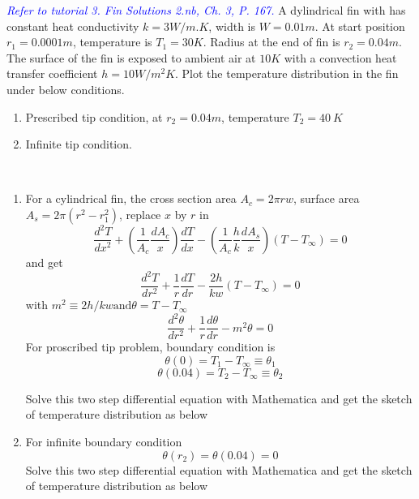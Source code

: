 \begin{example}
\textcolor{blue} {\emph{Refer to tutorial 3.  Fin Solutions 2.nb, Ch. 3, P. 167.}}
A dylindrical fin with has constant heat conductivity  $k=3W/m.K$, width is
$W=0.01m$. At start position $r_1=0.0001m$, temperature is $T_1=30K$. Radius at
the end of fin is $r_2=0.04m$. The surface of the fin is exposed to ambient air at
$10K$ with a convection heat transfer coefficient $h=10W/m^2K$. Plot the temperature distribution in the fin under below conditions.
\begin{enumerate}
\item Prescribed tip condition, at $r_2=0.04m$, temperature $T_2=40~K$
\item Infinite tip condition.
\end{enumerate}
\end{example}

\begin{solution}
~\\
\begin{enumerate}
\item For a cylindrical fin, the cross section area $A_c=2\pi rw$,
surface area $A_s=2\pi(r^2-r_1^2)$, replace $x$ by $r$ in
$$
\frac{d^2 T}{dx^2} + 
\left(\frac{1}{A_c}\frac{dA_c}{x}\right)\frac{dT}{dx}-
\left(\frac{1}{A_c}\frac{h}{k}\frac{dA_s}{x}\right)(T-T_\infty)=0
$$
and get
$$
\frac{d^2 T}{dr^2}+
\frac{1}{r}\frac{dT}{dr}-
\frac{2h}{kw}(T-T_\infty)=0
$$
with $m^2 \equiv 2h/kw \text{and} \theta=T-T_\infty$
$$
\frac{d^2 \theta}{dr^2}+
\frac{1}{r}\frac{d\theta}{dr}-
m^2\theta=0
$$
For proscribed tip problem, boundary condition is 
$$\theta(0)=T_1-T_\infty \equiv \theta_1$$
$$\theta(0.04)=T_2-T_\infty \equiv \theta_2$$

Solve this two step differential equation with Mathematica and get the sketch of temperature distribution as below
\item For infinite boundary condition
$$\theta(r_2)=\theta(0.04)=0$$
Solve this two step differential equation with Mathematica and get the sketch of temperature distribution as below
\end{enumerate}
\end{solution}

















